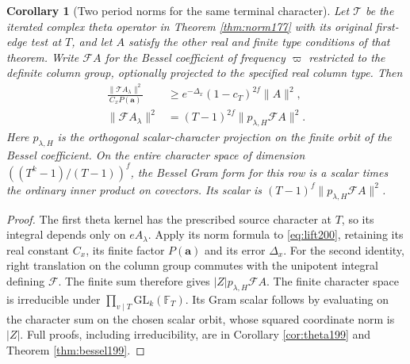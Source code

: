 \documentclass[a4paper,11pt]{article}
\newtheorem{corollary}[proposition]{Corollary}
\theoremstyle{definition}
\theoremstyle{remark}
\numberwithin{equation}{section}
\begin{document}
\begin{corollary}[Two period norms for the same terminal character]
\label{cor:original200}
Let \(\mathcal T\) be the iterated complex theta operator in
Theorem \ref{thm:norm177}
with its original first-edge test at \(T\), and let \(A\)
satisfy the other real and finite type conditions of that
theorem. Write \(\mathcal F A\) for the Bessel coefficient of
frequency \(\varpi\) restricted to the definite column group,
optionally projected to the specified real column type. Then
\begin{align}
  \frac{\|\mathcal T A_\lambda\|^2}{C_xP(\mathbf a)}
       &\ge e^{-\Delta_x}(1-c_T)^{2f}\|A\|^2 ,
                                                    \label{eq:theta200}\\
  \|\mathcal F A_\lambda\|^2
       &=(T-1)^{2f}\|p_{\lambda,H}\mathcal F A\|^2 .
                                                    \label{eq:bessel200}
\end{align}
Here \(p_{\lambda,H}\) is the orthogonal scalar-character
projection on the finite orbit of the Bessel coefficient.
On the entire character space of dimension
\(((T^k-1)/(T-1))^f\), the Bessel Gram form for this row is a
scalar times the ordinary inner product on covectors. Its
scalar is \((T-1)^f\|p_{\lambda,H}\mathcal F A\|^2\).
\end{corollary}
\begin{proof}
The first theta kernel has the prescribed source character
at \(T\), so its integral depends only on \(eA_\lambda\).
Apply its norm formula to \eqref{eq:lift200}, retaining its
real constant \(C_x\), its finite factor \(P(\mathbf a)\)
and its error \(\Delta_x\).
For the second identity, right translation on the column
group commutes with the unipotent integral defining
\(\mathcal F\). The finite sum therefore gives
\(|Z|p_{\lambda,H}\mathcal F A\). The finite character
space is irreducible under \(\prod_{v\mid T}\mathrm{GL}_k(\mathbb F_T)\).
Its Gram scalar follows by evaluating on the character
sum on the chosen scalar orbit, whose squared coordinate
norm is \(|Z|\). Full proofs, including irreducibility, are in
Corollary \ref{cor:theta199} and Theorem \ref{thm:bessel199}.
\end{proof}
\end{document}
